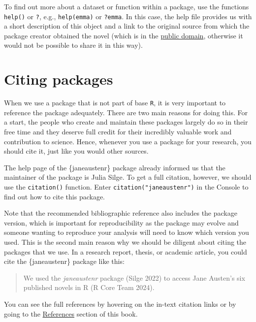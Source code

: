 \documentclass[
  letterpaper,
  DIV=11,
  numbers=noendperiod,
  oneside]{scrreprt}
\begin{document}
To find out more about a dataset or function within a package, use the
functions \texttt{help()} or \texttt{?}, e.g., \texttt{help(emma)} or
\texttt{?emma}. In this case, the help file provides us with a short
description of this object and a link to the original source from which
the package creator obtained the novel (which is in the
\href{https://www.gutenberg.org/help/faq.html\#what-books-does-project-gutenberg-publish}{public
domain}, otherwise it would not be possible to share it in this way).

\section{Citing packages}\label{citing-packages}

When we use a package that is not part of base \texttt{R}, it is very
important to reference the package adequately. There are two main
reasons for doing this. For a start, the people who create and maintain
these packages largely do so in their free time and they deserve full
credit for their incredibly valuable work and contribution to science.
Hence, whenever you use a package for your research, you should cite it,
just like you would other sources.

The help page of the \{janeaustenr\} package already informed us that
the maintainer of the package is Julia Silge. To get a full citation,
however, we should use the \texttt{citation()} function. Enter
\texttt{citation("janeaustenr")} in the Console to find out how to cite
this package.

Note that the recommended bibliographic reference also includes the
package version, which is important for reproducibility as the package
may evolve and someone wanting to reproduce your analysis will need to
know which version you used. This is the second main reason why we
should be diligent about citing the packages that we use. In a research
report, thesis, or academic article, you could cite the \{janeaustenr\}
package like this:

\begin{quote}
We used the \emph{janeaustenr} package (Silge 2022) to access Jane
Austen's six published novels in R (R Core Team 2024).
\end{quote}

You can see the full references by hovering on the in-text citation
links or by going to the
\href{https://elenlefoll.github.io/RstatsTextbook/references.html}{References}
section of this book.
\end{document}
